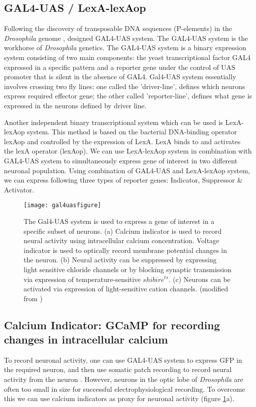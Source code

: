 \subsection{GAL4-UAS / LexA-lexAop}
Following the discovery of transposable DNA sequences (P-elements) in the \textit{Drosophila} genome \parencite{Rubin1982}, \cite{Brand1993} designed GAL4-UAS system. The GAL4-UAS system is the workhorse of \textit{Drosophila} genetics. The GAL4-UAS system is a binary expression system consisting of two main components: the yeast transcriptional factor GAL4 expressed in a specific pattern and a reporter gene under the control of UAS promoter that is silent in the absence of GAL4. Gal4-UAS system essentially involves crossing two fly lines: one called the 'driver-line', defines which neurons express required effector gene; the other called 'reporter-line', defines what gene is expressed in the neurons defined by driver line. 

Another independent binary transcriptional system which can be used is LexA-lexAop system. This method is based on the bacterial DNA-binding operator lexAop and controlled by the expression of LexA. LexA binds to and activates the lexA operator (lexAop). We can use LexA-lexAop system in combination with GAL4-UAS system to simultaneously express gene of interest in two different neuronal population. Using combination of GAL4-UAS and LexA-lexAop system, we can express following three types of reporter genes: Indicator, Suppressor \& Activator.
\begin{figure}
\centering
\hspace*{-1cm} 
\texttt{[image: gal4uasfigure]}
\caption[Genetic tools for functional manipulations in \textit{Drosophila}] {The Gal4-UAS system is used to express a gene of interest in a specific subset of neurons. (a) Calcium indicator is used to record neural activity using intracellular calcium concentration. Voltage indicator is used to optically record membrane potential changes in the neuron. (b) Neural activity can be suppressed by expressing light sensitive chloride channels or by blocking synaptic transmission via expression of temperature-sensitive $shibire^{ts}$. (c) Neurons can be activated via expression of light-sensitive cation channels. (modified from \cite{Borst2009})}
\label{fig:gal4uas}
\end{figure}
\subsection{Calcium Indicator: GCaMP for recording changes in intracellular calcium}
To record neuronal activity, one can use GAL4-UAS system to express GFP in the required neuron, and then use somatic patch recording to record neural activity from the neuron \parencite{Wilson2004, Joesch2008}. However, neurons in the optic lobe of \textit{Drosophila} are often too small in size for successful electrophysiological recording. To overcome this we can use calcium indicators as proxy for neuronal activity (figure  \ref{fig:gal4uas}a). 

